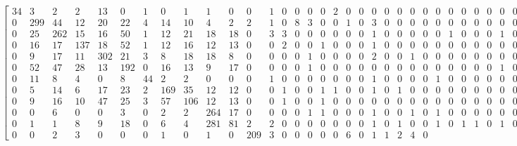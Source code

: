 \begin{equation*}
\begin{bmatrix}
    34	&	3	&	2	&	2	&	13	&	0	&	1	&	0	&	1	&	1	&	0	&	0	&	1	&	0	&	0	&	0	&	0	&	2	&	0	&	0	&	0	&	0	&	0	&	0	&	0
        &	0	&	0	&	0	&	0	&	0	&	0	&	0	&	0	&	0	&	0	&	0	&	0	&	0	&	0	&	0	&	0	&	0	&	0 \\
0	&	299	&	44	&	12	&	20	&	22	&	4	&	14	&	10	&	4	&	2	&	2	&	1	&	0	&	8	&	3	&	0	&	0	&	1	&	0	&	3	&	0	&	0	&	0	&	0	&
0	&	0	&	0	&	0	&	0	&	0	&	0	&	1	&	0	&	0	&	0	&	0	&	0	&	0	&	0	&	0	&	0	&	0 \\
0	&	25	&	262	&	15	&	16	&	50	&	1	&	12	&	21	&	18	&	18	&	0	&	3	&	3	&	0	&	0	&	0	&	0	&	0	&	0	&	1	&	0	&	0	&	0	&	0	&
0	&	1	&	0	&	0	&	0	&	1	&	0	&	1	&	0	&	0	&	0	&	0	&	0	&	0	&	0	&	0	&	2	&	0 \\
0	&	16	&	17	&	137	&	18	&	52	&	1	&	12	&	16	&	12	&	13	&	0	&	0	&	2	&	0	&	0	&	1	&	0	&	0	&	0	&	1	&	0	&	0	&	0	&	0	&
0	&	0	&	0	&	0	&	0	&	0	&	0	&	1	&	0	&	0	&	0	&	0	&	0	&	0	&	0	&	0	&	0	&	1 \\
0	&	9	&	17	&	11	&	302	&	21	&	3	&	8	&	18	&	18	&	8	&	0	&	0	&	0	&	0	&	1	&	0	&	0	&	0	&	0	&	2	&	0	&	0	&	1	&	0	&
0	&	0	&	0	&	0	&	0	&	0	&	0	&	0	&	0	&	0	&	0	&	0	&	0	&	0	&	0	&	0	&	0	&	1 \\
0	&	52	&	47	&	28	&	13	&	192	&	0	&	16	&	13	&	9	&	17	&	0	&	0	&	0	&	0	&	1	&	0	&	0	&	0	&	0	&	0	&	0	&	0	&	0	&	0	&
0	&	0	&	0	&	0	&	0	&	1	&	0	&	0	&	0	&	0	&	0	&	0	&	0	&	0	&	0	&	0	&	0	&	1 \\
0	&	11	&	8	&	4	&	0	&	8	&	44	&	2	&	2	&	0	&	0	&	0	&	1	&	0	&	0	&	0	&	0	&	0	&	0	&	0	&	1	&	0	&	0	&	0	&	0	&
1	&	0	&	0	&	0	&	0	&	0	&	0	&	4	&	0	&	0	&	0	&	0	&	0	&	0	&	0	&	0	&	2	&	2 \\
0	&	5	&	14	&	6	&	17	&	23	&	2	&	169	&	35	&	12	&	12	&	0	&	0	&	1	&	0	&	0	&	1	&	1	&	0	&	0	&	1	&	0	&	1	&	0	&	0	&
0	&	0	&	0	&	0	&	0	&	0	&	0	&	0	&	0	&	0	&	0	&	0	&	0	&	0	&	0	&	0	&	0	&	0 \\
0	&	9	&	16	&	10	&	47	&	25	&	3	&	57	&	106	&	12	&	13	&	0	&	0	&	1	&	0	&	0	&	1	&	0	&	0	&	0	&	0	&	0	&	0	&	0	&	0	&
0	&	0	&	0	&	0	&	0	&	0	&	0	&	0	&	0	&	0	&	0	&	0	&	0	&	0	&	0	&	0	&	0	&	0 \\
0	&	0	&	6	&	0	&	0	&	3	&	0	&	2	&	2	&	264	&	17	&	0	&	0	&	0	&	0	&	1	&	1	&	0	&	0	&	0	&	1	&	0	&	0	&	1	&	0	&
1	&	0	&	0	&	0	&	0	&	0	&	0	&	1	&	0	&	0	&	0	&	0	&	0	&	0	&	0	&	0	&	0	&	0 \\
0	&	1	&	1	&	8	&	9	&	18	&	0	&	6	&	4	&	281	&	81	&	2	&	2	&	0	&	0	&	0	&	0	&	0	&	0	&	0	&	1	&	0	&	1	&	0	&	0	&
1	&	0	&	1	&	1	&	0	&	1	&	0	&	0	&	0	&	0	&	0	&	0	&	0	&	0	&	0	&	0	&	0	&	1 \\
0	&	0	&	2	&	3	&	0	&	0	&	0	&	1	&	0	&	1	&	0	&	209	&	3	&	0	&	0	&	0	&	0	&	0	&	6	&	0	&	1	&	1	&	2	&	4	&	0	&

\end{bmatrix}
\end{equation*}
